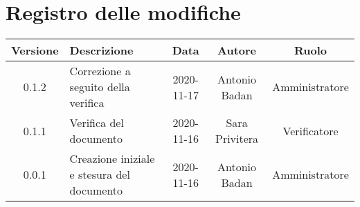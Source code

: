 \section*{Registro delle modifiche}

\begin{center}
	\begin{longtable}{|c|p{5cm}|c|c|c|}
	\hline
	\rowcolor{lighter-grayer}
	\textbf{Versione} & \textbf{Descrizione} & \textbf{Data} & \textbf{Autore} & \textbf{Ruolo} \\
	\hline
	\endfirsthead


	0.1.2 & Correzione a seguito della verifica & 2020-11-17 & Antonio Badan & Amministratore \\
	\hline
	0.1.1 & Verifica del documento & 2020-11-16 & Sara Privitera & Verificatore \\
	\hline
	0.0.1 & Creazione iniziale e stesura del documento & 2020-11-16 & Antonio Badan & Amministratore \\
	\hline
	\end{longtable}
\end{center}
